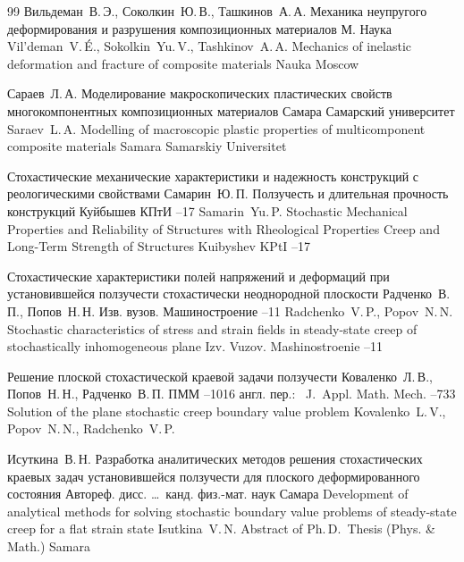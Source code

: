 \begin{thebibliography}{99}
\by Вильдеман~В.\,Э., Соколкин~Ю.\,В., Ташкинов~А.\,А.
\book Механика неупругого деформирования и разрушения композиционных материалов
\publaddr М.
\publ Наука
\misctransl
\by Vil'deman~V.\,\'E., Sokolkin~Yu.\,V., Tashkinov~A.\,A. 
\book Mechanics of inelastic deformation and fracture of composite materials
\publ Nauka
\publaddr Moscow


\by Сараев~Л.\,А.
\book Моделирование макроскопических пластических свойств многокомпонентных композиционных материалов
\publaddr Самара
\publ Самарский университет
\misctransl
\by Saraev~L.\,A.
\book  Modelling of macroscopic plastic properties of multicomponent composite materials
\publaddr Samara
\publ Samarskiy Universitet

\paper Стохастические механические характеристики и надежность конструкций с реологическими свойствами
\by Самарин~Ю.\,П.
\inbook Ползучесть и длительная прочность конструкций
\publaddr Куйбышев
\publ КПтИ
--17
\misctransl
\by Samarin~Yu.\,P.
\paper Stochastic Mechanical Properties and Reliability of Structures with Rheological Properties
\inbook Creep and Long-Term Strength of Structures
\publaddr Kuibyshev
\publ KPtI
--17

\paper Стохастические характеристики полей напряжений и деформаций при установившейся ползучести стохастически неоднородной плоскости
\by Радченко~В.\,П., Попов~Н.\,Н.
\jour Изв. вузов. Машиностроение
--11
\misctransl
\by Radchenko~V.\,P., Popov~N.\,N.
\paper Stochastic characteristics of stress and strain fields in steady-state creep of stochastically inhomogeneous plane
\jour Izv. Vuzov. Mashinostroenie
--11

\paper Решение плоской стохастической краевой задачи ползучести
\by Коваленко~Л.\,В., Попов~Н.\,Н., Радченко~В.\,П. 
\jour ПММ
--1016
\transl англ. пер.:~
\jour J.~Appl. Math. Mech.
–733
\paper Solution of the plane stochastic creep boundary value problem
\by Kovalenko~L.\,V.,  Popov~N.\,N., Radchenko~V.\,P.

\by Исуткина~В.\,Н.
\thesis Разработка аналитических методов решения стохастических краевых задач установившейся ползучести для плоского деформированного состояния
\thesisinfo Автореф. дисс. \dots\ канд. физ.-мат. наук
\publaddr Самара
\misctransl
\thesis Development of analytical methods for solving stochastic boundary value problems of  steady-state creep for  a flat strain state
\by Isutkina~V.\,N.
\thesisinfo Abstract of Ph.\,D.~Thesis (Phys. \& Math.)
\publaddr Samara


\end{thebibliography}

